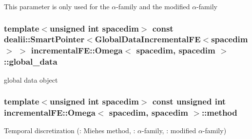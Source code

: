 This parameter is only used for the $\alpha$-\/family and the modified $\alpha$-\/family 
\subsubsection[{\texorpdfstring{global\+\_\+data}{global_data}}]{\setlength{\rightskip}{0pt plus 5cm}template$<$unsigned int spacedim$>$ const dealii\+::\+Smart\+Pointer$<${\bf Global\+Data\+Incremental\+FE}$<$spacedim$>$ $>$ {\bf incremental\+F\+E\+::\+Omega}$<$ spacedim, spacedim $>$\+::global\+\_\+data\hspace{0.3cm}{\ttfamily [private]}}\hypertarget{classincremental_f_e_1_1_omega_3_01spacedim_00_01spacedim_01_4_afffe781a5a2032ec003032adc78e1bf3}{}\label{classincremental_f_e_1_1_omega_3_01spacedim_00_01spacedim_01_4_afffe781a5a2032ec003032adc78e1bf3}
global data object 
\subsubsection[{\texorpdfstring{method}{method}}]{\setlength{\rightskip}{0pt plus 5cm}template$<$unsigned int spacedim$>$ const unsigned int {\bf incremental\+F\+E\+::\+Omega}$<$ spacedim, spacedim $>$\+::method\hspace{0.3cm}{\ttfamily [private]}}\hypertarget{classincremental_f_e_1_1_omega_3_01spacedim_00_01spacedim_01_4_a6c95d57122261e8a2e26d3818251bc9b}{}\label{classincremental_f_e_1_1_omega_3_01spacedim_00_01spacedim_01_4_a6c95d57122261e8a2e26d3818251bc9b}
Temporal discretization ({}\+: Miehe\textquotesingle{}s method, {}\+: $\alpha$-\/family, {}\+: modified $\alpha$-\/family) 
